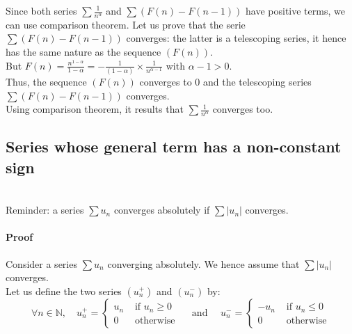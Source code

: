 \documentclass[notitlepage]{math}
\begin{document}
\begin{enumerate}
    Since both series $\sum \frac{1}{n^\alpha}$ and $\sum \left(F(n) - F(n-1)\right)$ have positive terms, we can use comparison theorem.
    Let us prove that the serie $\sum \left(F(n) - F(n-1)\right)$ converges: the latter is a telescoping series, it hence has the same nature as the sequence $(F(n))$.\\[0.5em]

    But $F(n) = \frac{n^{1-\alpha}}{1-\alpha} = -\frac{1}{(1-\alpha)} \times \frac{1}{n^{\alpha-1}}$ with $\alpha - 1 > 0$.\\

    Thus, the sequence $(F(n))$ converges to $0$ and the telescoping series $\sum \left(F(n) - F(n-1)\right)$ converges.\\[0.5em]

    Using comparison theorem, it results that $\sum \frac{1}{n^\alpha}$ converges too.
\end{enumerate}
\subsection{Series whose general term has a non-constant sign}
\\[1em]
{\color{blue} Reminder: a series $\sum u_n$ converges absolutely if $\sum \left\lvert u_n \right\rvert$ converges.}
\paragraph{Proof}
\noindent Consider a series $\sum u_n$ converging absolutely. We hence assume that $\sum \left\lvert u_n \right\rvert$ converges.\\[0.5em]
Let us define the two series $(u_n^+)$ and $(u_n^-)$ by:
\[ \forall n \in \mathbb{N}, \quad u_n^+ = \begin{cases}
    u_n & \text{ if } u_n \geq 0\\
    0 & \text{ otherwise}
\end{cases} \quad \text{ and } \quad u_n^- = \begin{cases}
    -u_n & \text{ if } u_n \leq 0\\
    0 & \text{ otherwise}
\end{cases} \]
\end{document}
